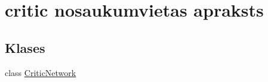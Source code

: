 \hypertarget{namespacecritic}{}\section{critic nosaukumvietas apraksts}
\label{namespacecritic}
\subsection*{Klases}
\begin{DoxyCompactItemize}
\item 
class \hyperlink{classcritic_1_1_critic_network}{Critic\+Network}
\end{DoxyCompactItemize}
